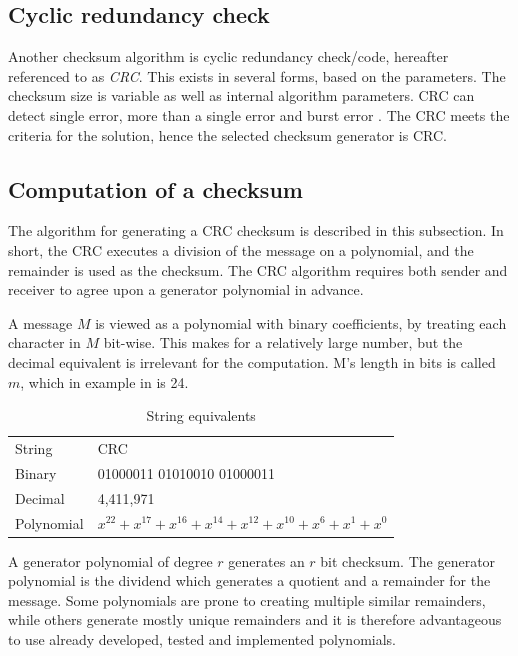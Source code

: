 \subsection*{Cyclic redundancy check}
Another checksum algorithm is cyclic redundancy check/code, hereafter referenced to as \textit{CRC}. This exists in several forms, based on the parameters. The checksum size is variable as well as internal algorithm parameters.  CRC can detect single error, more than a single error and burst error \cite[p.~31]{elahi2001network}. The CRC meets the criteria for the solution, hence the selected checksum generator is CRC.

\subsection{Computation of a checksum}
The algorithm for generating a CRC checksum is described in this subsection.
In short, the CRC executes a division of the message on a polynomial, and the remainder is used as the checksum. 
The CRC algorithm requires both sender and receiver to agree upon a generator polynomial in advance.

A message $M$ is viewed as a polynomial with binary coefficients, by treating each character in $M$ bit-wise. This makes for a relatively large number, but the decimal equivalent is irrelevant for the computation. M's length in bits is called $m$, which in example in  is 24.

\begin{table}[h!]
	\centering
	\begin{tabular}{ll}
		String  & CRC                        \\
		Binary  & 01000011 01010010 01000011 \\
		Decimal & 4,411,971                  \\
		Polynomial & $x^{22} + x^{17} + x^{16} + x^{14} + x^{12} + x^{10} + x^{6} + x^{1} + x^{0}$
	\end{tabular}
	\caption{String equivalents}
	\label{tab:string}
\end{table}

A generator polynomial of degree $r$ generates an $r$ bit checksum. The generator polynomial is the dividend which generates a quotient and a remainder for the message. Some polynomials are prone to creating multiple similar remainders, while others generate mostly unique remainders and it is therefore advantageous to use already developed, tested and implemented polynomials.


